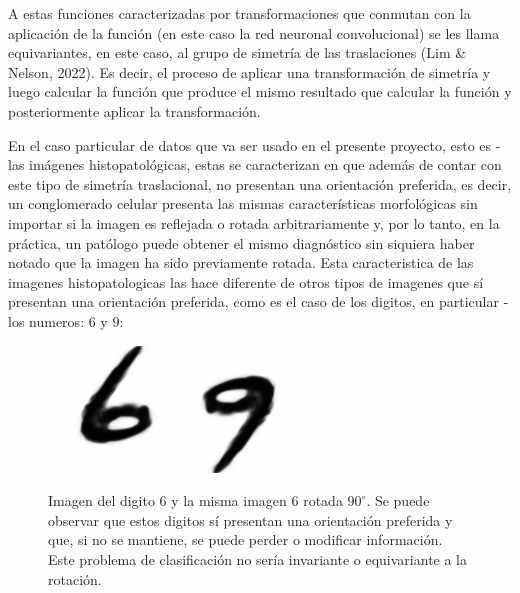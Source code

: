 \documentclass[12pt,letterpaper,final, openany]{scrbook}
\begin{document}
A estas funciones caracterizadas por transformaciones que conmutan con la aplicación de la función (en este caso la red neuronal convolucional) se les llama equivariantes, en este caso, al grupo de simetría de las traslaciones (Lim \& Nelson, 2022). Es decir, el proceso de aplicar una transformación de simetría y luego calcular la función que produce el mismo resultado que calcular la función y posteriormente aplicar la transformación.

En el caso particular de datos que va ser usado en el presente proyecto, esto es - las imágenes histopatológicas, estas se caracterizan en que además de contar con este tipo de simetría traslacional, no presentan una orientación preferida, es decir, un conglomerado celular presenta las mismas características morfológicas sin importar si la imagen es reflejada o rotada arbitrariamente y, por lo tanto, en la práctica, un patólogo puede obtener el mismo diagnóstico sin siquiera haber notado que la imagen ha sido previamente rotada. Esta caracteristica de las imagenes histopatologicas las hace diferente de otros tipos de imagenes que sí presentan una orientación preferida, como es el caso de los digitos, en particular - los numeros: $6$ y $9$:
\begin{figure}[h!]
    \centering
    \includegraphics[width=0.3\textwidth]{6.png}
    \includegraphics[width=0.3\textwidth]{9.png}
    \caption{Imagen del digito $6$ y la misma imagen $6$ rotada $90 ^{\circ}$. Se puede observar que estos digitos sí presentan una orientación preferida y que, si no se mantiene, se puede perder o modificar información. Este problema de clasificación no sería invariante o equivariante a la rotación.}
    \label{fig:69}
\end{figure}
\end{document}
